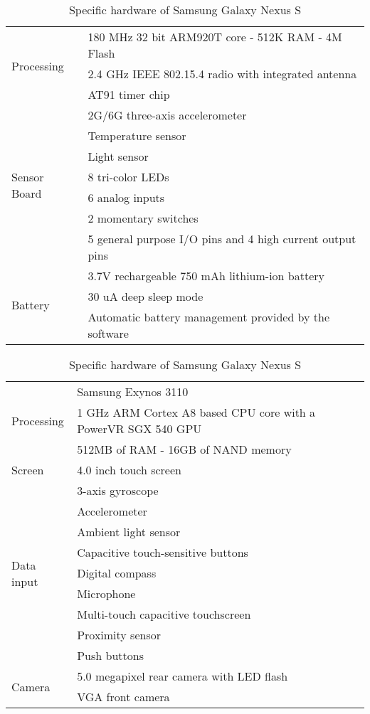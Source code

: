 \begin{table}[ptb]
\caption{Specific hardware of SunSpot Sensor Node}
\label{tab:implement_specific_sunspot}
\begin{center}
\begin{tabular}{|l|p{9cm}|}
\hline
\multirow{3}{*}{Processing} & 180 MHz 32 bit ARM920T core - 512K RAM - 4M Flash\\
					 &2.4 GHz IEEE 802.15.4 radio with integrated antenna\\
					 &AT91 timer chip\\ 
\hline					  
\multirow{7}{*}{Sensor Board}&2G/6G three-axis accelerometer\\
						&Temperature sensor\\
						&Light sensor\\
						&8 tri-color LEDs\\
						&6 analog inputs\\
						&2 momentary switches\\
						&5 general purpose I/O pins and 4 high current output pins\\
\hline
\multirow{7}{*}{Battery}&3.7V rechargeable 750 mAh lithium-ion battery\\
					&30 uA deep sleep mode\\
					&Automatic battery management provided by the software\\
\hline
\end{tabular}
\end{center}

\caption{Specific hardware of Samsung Galaxy Nexus S}
\label{tab:implement_specific_nexus}
\begin{center}
\begin{tabular}{|l|p{12cm}|}
\hline
\multirow{3}{*}{Processing} & Samsung Exynos 3110\\
					  &1 GHz ARM Cortex A8 based CPU core with a PowerVR SGX 540 GPU\\
					  &512MB of RAM - 16GB of NAND memory\\ 
\hline					  
\multirow{1}{*}{Screen}&4.0 inch touch screen\\
\hline
\multirow{9}{*}{Data input}&3-axis gyroscope\\
					&Accelerometer\\
					&Ambient light sensor\\
					&Capacitive touch-sensitive buttons\\
					&Digital compass\\
					&Microphone\\
					&Multi-touch capacitive touchscreen\\
					&Proximity sensor\\
					&Push buttons\\		
\hline
\multirow{2}{*}{Camera}&5.0 megapixel rear camera with LED flash\\
				    &VGA front camera\\
\hline
\end{tabular}
\end{center}

\end{table}%



